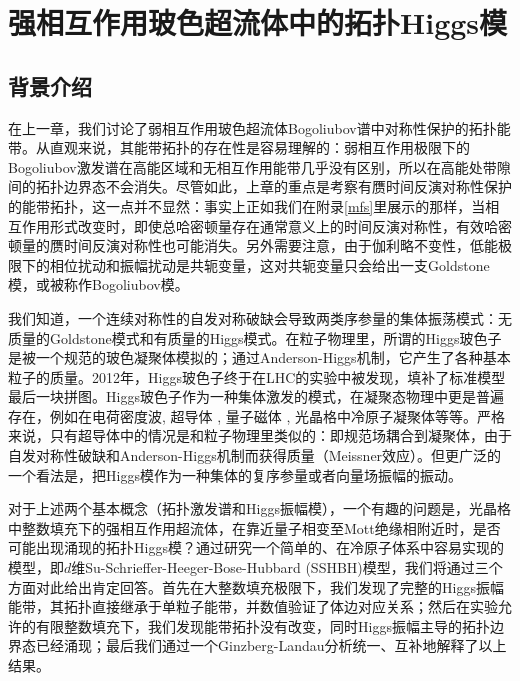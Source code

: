 
\chapter{强相互作用玻色超流体中的拓扑Higgs模}
\label{ch3}

\section{背景介绍}

在上一章，我们讨论了弱相互作用玻色超流体Bogoliubov谱中对称性保护的拓扑能带。从直观来说，其能带拓扑的存在性是容易理解的：弱相互作用极限下的Bogoliubov激发谱在高能区域和无相互作用能带几乎没有区别，所以在高能处带隙间的拓扑边界态不会消失。尽管如此，上章的重点是考察有赝时间反演对称性保护的能带拓扑，这一点并不显然：事实上正如我们在附录\ref{mfs}里展示的那样，当相互作用形式改变时，即使总哈密顿量存在通常意义上的时间反演对称性，有效哈密顿量的赝时间反演对称性也可能消失。另外需要注意，由于伽利略不变性，低能极限下的相位扰动和振幅扰动是共轭变量，这对共轭变量只会给出一支Goldstone模，或被称作Bogoliubov模。

我们知道，一个连续对称性的自发对称破缺会导致两类序参量的集体振荡模式：无质量的Goldstone模式和有质量的Higgs模式。在粒子物理里，所谓的Higgs玻色子\cite{Higgs1964}是被一个规范的玻色凝聚体模拟的；通过Anderson-Higgs机制\cite{Anderson1963}，它产生了各种基本粒子的质量。2012年，Higgs玻色子终于在LHC的实验中被发现\cite{Aad2012,Chatrchyan2012}，填补了标准模型最后一块拼图。Higgs玻色子作为一种集体激发的模式，在凝聚态物理中更是普遍存在，例如在电荷密度波\cite{Yusupov2010}, 超导体 \cite{Tsuchiya2018}, 量子磁体 \cite{Su2020}, 光晶格中冷原子凝聚体\cite{Endres2012,Pollet2012,Liu2015}等等。严格来说，只有超导体中的情况是和粒子物理里类似的：即规范场耦合到凝聚体，由于自发对称性破缺和Anderson-Higgs机制而获得质量（Meissner效应）。但更广泛的一个看法是，把Higgs模作为一种集体的复序参量或者向量场振幅的振动。

对于上述两个基本概念（拓扑激发谱和Higgs振幅模），一个有趣的问题是，光晶格中整数填充下的强相互作用超流体，在靠近量子相变至Mott绝缘相附近时，是否可能出现涌现的拓扑Higgs模？通过研究一个简单的、在冷原子体系中容易实现的模型，即$d$维Su-Schrieffer-Heeger-Bose-Hubbard (SSHBH)模型，我们将通过三个方面对此给出肯定回答。首先在大整数填充极限下，我们发现了完整的Higgs振幅能带，其拓扑直接继承于单粒子能带，并数值验证了体边对应关系；然后在实验允许的有限整数填充下，我们发现能带拓扑没有改变，同时Higgs振幅主导的拓扑边界态已经涌现；最后我们通过一个Ginzberg-Landau分析统一、互补地解释了以上结果。

